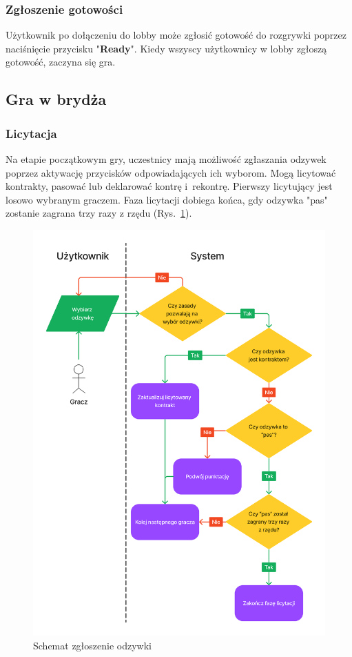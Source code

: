 \FloatBarrier

\subsubsection{Zgłoszenie gotowości}
Użytkownik po dołączeniu do lobby może zgłosić gotowość do rozgrywki poprzez
naciśnięcie przycisku "\textbf{Ready}". Kiedy wszyscy użytkownicy w lobby zgłoszą
gotowość, zaczyna się gra.

\subsection{Gra w brydża}

\subsubsection{Licytacja}
Na etapie początkowym gry, uczestnicy mają możliwość zgłaszania odzywek poprzez
aktywację przycisków odpowiadających ich wyborom. Mogą licytować kontrakty, pasować lub
deklarować kontrę i~rekontrę. Pierwszy licytujący jest losowo
wybranym graczem. Faza licytacji dobiega końca, gdy odzywka "pas" zostanie zagrana
trzy razy z rzędu (Rys.~\ref{fig:schemat_bid}).

\begin{figure}[h]
  \centering
  \includegraphics[width=\textwidth]{img/schematy/bid.png}
  \caption{Schemat zgłoszenie odzywki}
  \label{fig:schemat_bid}
\end{figure}

